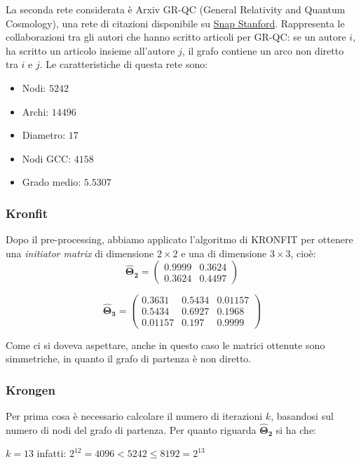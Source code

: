 \documentclass[12pt]{scrartcl}
\begin{document}
La seconda rete considerata è Arxiv GR-QC (General Relativity and Quantum Cosmology), una rete di citazioni disponibile su \href{http://snap.stanford.edu/data/ca-GrQc.html}{Snap Stanford}. Rappresenta le collaborazioni tra gli autori che hanno scritto articoli per GR-QC: se un autore $i$, ha scritto un articolo insieme all'autore $j$, il grafo contiene un arco non diretto tra $i$ e $j$. Le caratteristiche di questa rete sono:
\begin{itemize}
	\item Nodi: $5242$
	\item Archi: $14496$
	\item Diametro: $17$
	\item Nodi GCC: $4158$
	\item Grado medio: $5.5307$
\end{itemize}

\subsubsection{Kronfit}

Dopo il pre-processing, abbiamo applicato l'algoritmo di \textsf{KRONFIT} per ottenere una \textit{initiator matrix} di dimensione $2\times2$ e una di dimensione $3\times3$, cioè:
\[
	\mathbf{\hat{\Theta}_2} = 
	\begin{pmatrix}
		0.9999 & 0.3624 \\
		0.3624 & 0.4497 
	\end{pmatrix}
\]

\[
	\mathbf{\hat{\Theta}_3} =
	\begin{pmatrix}
		0.3631 & 0.5434 & 0.01157 \\
		0.5434 & 0.6927 & 0.1968 \\
		0.01157 & 0.197 & 0.9999 
	\end{pmatrix}  
\]

Come ci si doveva aspettare, anche in questo caso le matrici ottenute sono simmetriche, in quanto il grafo di partenza è non diretto.

\subsubsection{Krongen}
Per prima cosa è necessario calcolare il numero di iterazioni $k$, basandosi sul numero di nodi del grafo di partenza. Per quanto riguarda $\mathbf{\hat{\Theta}_2}$ si ha che:

\begin{center}
	$k = 13$ infatti: $2^{12} = 4096 < 5242 \leq 8192 = 2^{13}$
\end{center}
\end{document}
